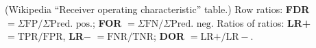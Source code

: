 (Wikipedia ``Receiver operating characteristic'' table.) Row ratios:
\textbf{FDR} $=\Sigma\text{FP}/\Sigma\text{Pred.\ pos.}$;
\textbf{FOR} $=\Sigma\text{FN}/\Sigma\text{Pred.\ neg.}$
Ratios of ratios: \textbf{LR+} $=\text{TPR}/\text{FPR}$, \textbf{LR$-$} $=\text{FNR}/\text{TNR}$;
\textbf{DOR} $=\text{LR+}/\text{LR}-$.


